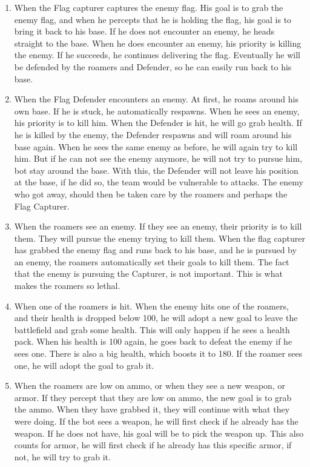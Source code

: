 \begin{enumerate}
	\item When the Flag capturer captures the enemy flag. His goal is to grab the enemy flag, and when he percepts that he is holding the flag, his goal is to bring it back to his base. If he does not encounter an enemy, he heads straight to the base. When he does encounter an enemy, his priority is killing the enemy. If he succeeds, he continues delivering the flag. Eventually he will be defended by the roamers and Defender, so he can easily run back to his base.\\
	\item When the Flag Defender encounters an enemy. At first, he roams around his own base. If he is stuck, he automatically respawns. When he sees an enemy, his priority is to kill him. When the Defender is hit, he will go grab health. If he is killed by the enemy, the Defender respawns and will roam around his base again. When he sees the same enemy as before, he will again try to kill him. But if he can not see the enemy anymore, he will not try to pursue him, bot stay around the base. With this, the Defender will not leave his position at the base, if he did so, the team would be vulnerable to attacks. The enemy who got away, should then be taken care by the roamers and perhaps the Flag Capturer.\\
	\item When the roamers see an enemy. If they see an enemy, their priority is to kill them. They will pursue the enemy trying to kill them. When the flag capturer has grabbed the enemy flag and runs back to his base, and he is pursued by an enemy, the roamers automatically set their goals to kill them. The fact that the enemy is pursuing the Capturer, is not important. This is what makes the roamers so lethal. \\
	\item When one of the roamers is hit. When the enemy hits one of the roamers, and their health is dropped below 100, he will adopt a new goal to leave the battlefield and grab some health. This will only happen if he sees a health pack. When his health is 100 again, he goes back to defeat the enemy if he sees one. There is also a big health, which boosts it to 180. If the roamer sees one, he will adopt the goal to grab it.\\
	\item When the roamers are low on ammo, or when they see a new weapon, or armor. If they percept that they are low on ammo, the new goal is to grab the ammo. When they have grabbed it, they will continue with what they were doing. If the bot sees a weapon, he will first check if he already has the weapon. If he does not have, his goal will be to pick the weapon up. This also counts for armor, he will first check if he already has this specific armor, if not, he will try to grab it. \\

\end{enumerate}
